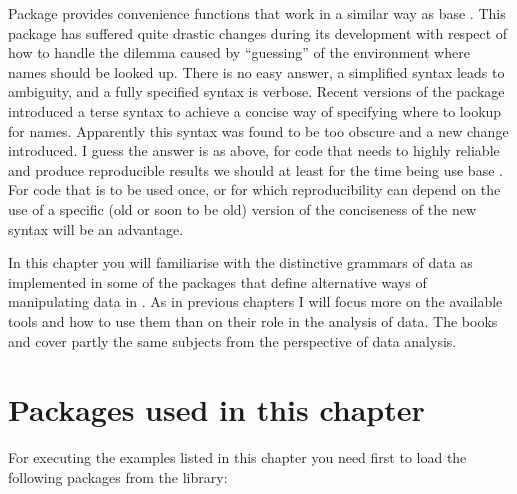 \documentclass[krantz2]{krantz}\usepackage{knitr}%
\begin{document}
Package  provides convenience functions that work in a similar way as base \Rlang {}. This package has suffered quite drastic changes during its development with respect of how to handle the dilemma caused by ``guessing'' of the environment where names should be looked up. There is no easy answer, a simplified syntax leads to ambiguity, and a fully specified syntax is verbose. Recent versions of the package introduced a terse syntax to achieve a concise way of specifying where to lookup for names. Apparently this syntax was found to be too obscure and a new change introduced. I guess the answer is as above, for code that needs to highly reliable and produce reproducible results we should at least for the time being use base \Rlang. For code that is to be used once, or for which reproducibility can depend on the use of a specific (old or soon to be old) version of  the conciseness of the new syntax will be an advantage.

In this chapter you will familiarise with the distinctive grammars of data as implemented in some of the packages that define alternative ways of manipulating data in \Rlang. As in previous chapters I will focus more on the available tools and how to use them than on their role in the analysis of data. The books  \autocite{Wickham2017} and  \autocite{Peng2016} cover partly the same subjects from the perspective of data analysis.

\section{Packages used in this chapter}

\begin{knitrout}\footnotesize
{}\color{fgcolor}\begin{kframe}
\begin{alltt}
\hlopt{::}
\end{alltt}
\end{kframe}
\end{knitrout}

For executing the examples listed in this chapter you need first to load the following packages from the library:
\end{document}
